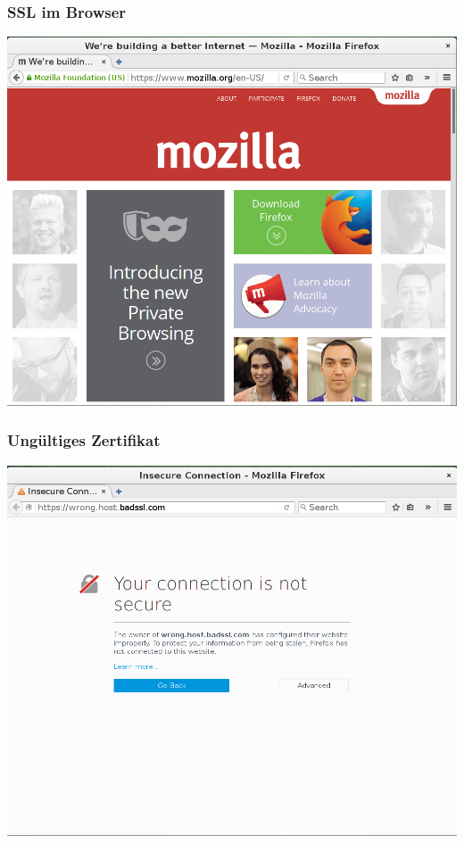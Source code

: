 \documentclass[12pt]{beamer}
\begin{document}
\begin{frame}
    \frametitle{SSL im Browser}
    \begin{center}
      \includegraphics[height=0.7\textheight]{img/ssl_special.png}
    \end{center}
\end{frame}

\begin{frame}
    \frametitle{Ungültiges Zertifikat}
    \begin{center}
	\includegraphics[height=0.7\textheight]{img/ssl_badcert.png}
    \end{center}
\end{frame}
\end{document}
